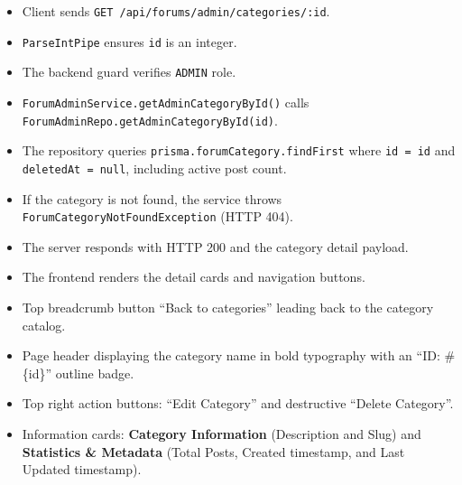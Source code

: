 \begin{itemize}[leftmargin=1.6em,topsep=3pt,itemsep=2pt,parsep=0pt,label=$\bullet$]
    \item Client sends \texttt{GET /api/forums/admin/categories/:id}.
    \item \texttt{ParseIntPipe} ensures \texttt{id} is an integer.
    \item The backend guard verifies \texttt{ADMIN} role.
    \item \texttt{Forum\allowbreak{}Admin\allowbreak{}Service.\allowbreak{}get\allowbreak{}Admin\allowbreak{}Category\allowbreak{}By\allowbreak{}Id()} calls \texttt{ForumAdminRepo.\allowbreak{}get\allowbreak{}Admin\allowbreak{}Category\allowbreak{}By\allowbreak{}Id(\allowbreak{}id)}.
    \item The repository queries \texttt{prisma.\allowbreak{}forumCategory.\allowbreak{}findFirst} where \texttt{id = id} and \texttt{deletedAt = null}, including active post count.
    \item If the category is not found, the service throws \texttt{Forum\allowbreak{}Category\allowbreak{}Not\allowbreak{}Found\allowbreak{}Exception} (HTTP 404).
    \item The server responds with HTTP 200 and the category detail payload.
    \item The frontend renders the detail cards and navigation buttons.
\end{itemize}

\begin{itemize}[leftmargin=1.6em,topsep=3pt,itemsep=2pt,parsep=0pt,label=$\bullet$]
    \item Top breadcrumb button ``Back to categories'' leading back to the category catalog.
    \item Page header displaying the category name in bold typography with an ``ID: \#\{id\}'' outline badge.
    \item Top right action buttons: ``Edit Category'' and destructive ``Delete Category''.
    \item Information cards: \textbf{Category Information} (Description and Slug) and \textbf{Statistics \& Metadata} (Total Posts, Created timestamp, and Last Updated timestamp).
\end{itemize}


